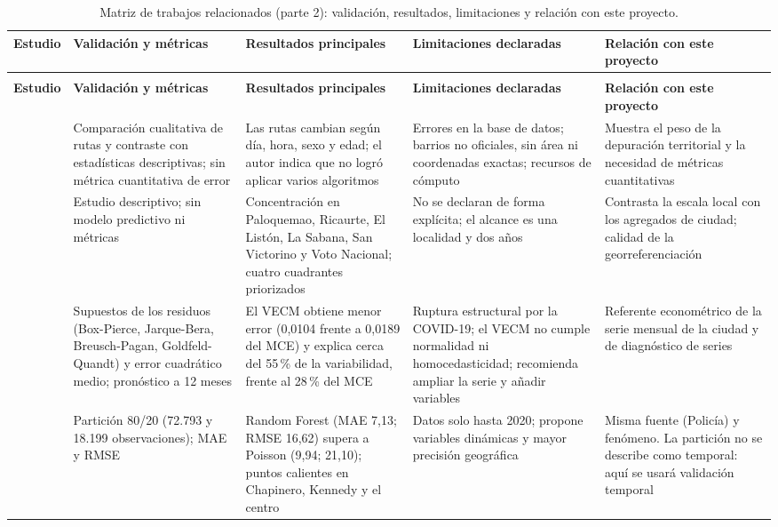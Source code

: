 \documentclass[12pt,letterpaper]{article}
\begin{document}
{\begin{longtable}{@{}>{\raggedright\arraybackslash}p{2.2cm}>{\raggedright\arraybackslash}p{3.1cm}>{\raggedright\arraybackslash}p{3.3cm}>{\raggedright\arraybackslash}p{3.0cm}>{\raggedright\arraybackslash}p{2.9cm}@{}}
\caption{Matriz de trabajos relacionados (parte 2): validación, resultados, limitaciones y relación con este proyecto.}\label{tab:matriz-resultados}\\
\toprule
\textbf{Estudio} & \textbf{Validación y métricas} & \textbf{Resultados principales} & \textbf{Limitaciones declaradas} & \textbf{Relación con este proyecto} \\
\midrule
\endfirsthead
\multicolumn{5}{@{}l}{\emph{Tabla~\ref{tab:matriz-resultados} (continuación)}}\\
\toprule
\textbf{Estudio} & \textbf{Validación y métricas} & \textbf{Resultados principales} & \textbf{Limitaciones declaradas} & \textbf{Relación con este proyecto} \\
\midrule
\endhead
\bottomrule
\endfoot
\citet{campo2017} & Comparación cualitativa de rutas y contraste con estadísticas descriptivas; sin métrica cuantitativa de error & Las rutas cambian según día, hora, sexo y edad; el autor indica que no logró aplicar varios algoritmos & Errores en la base de datos; barrios no oficiales, sin área ni coordenadas exactas; recursos de cómputo & Muestra el peso de la depuración territorial y la necesidad de métricas cuantitativas \\
\addlinespace
\citet{fonseca2019} & Estudio descriptivo; sin modelo predictivo ni métricas & Concentración en Paloquemao, Ricaurte, El Listón, La Sabana, San Victorino y Voto Nacional; cuatro cuadrantes priorizados & No se declaran de forma explícita; el alcance es una localidad y dos años & Contrasta la escala local con los agregados de ciudad; calidad de la georreferenciación \\
\addlinespace
\citet{garzon2025} & Supuestos de los residuos (Box-Pierce, Jarque-Bera, Breusch-Pagan, Goldfeld-Quandt) y error cuadrático medio; pronóstico a 12 meses & El VECM obtiene menor error (0,0104 frente a 0,0189 del MCE) y explica cerca del 55\,\% de la variabilidad, frente al 28\,\% del MCE & Ruptura estructural por la COVID-19; el VECM no cumple normalidad ni homocedasticidad; recomienda ampliar la serie y añadir variables & Referente econométrico de la serie mensual de la ciudad y de diagnóstico de series \\
\addlinespace
\citet{martinez2025} & Partición 80/20 (72.793 y 18.199 observaciones); MAE y RMSE & Random Forest (MAE 7,13; RMSE 16,62) supera a Poisson (9,94; 21,10); puntos calientes en Chapinero, Kennedy y el centro & Datos solo hasta 2020; propone variables dinámicas y mayor precisión geográfica & Misma fuente (Policía) y fenómeno. La partición no se describe como temporal: aquí se usará validación temporal \\

\end{longtable}}
\end{document}
